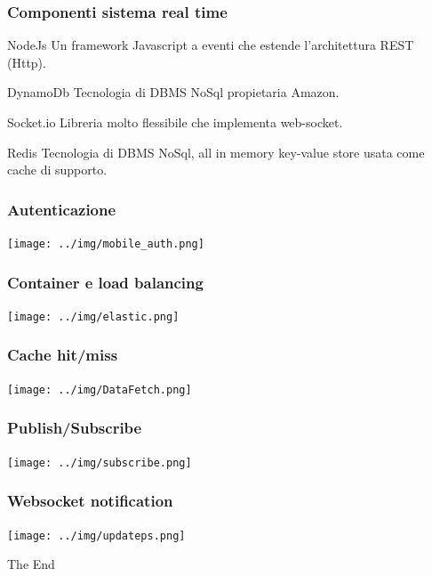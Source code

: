 \documentclass{beamer}
\begin{document}

\begin{frame}
\frametitle{Componenti sistema real time}
\begin{block}{NodeJs}
Un framework Javascript a eventi che estende l'architettura REST (Http). 
\end{block}

\begin{block}{DynamoDb}
Tecnologia di DBMS NoSql propietaria Amazon.
\end{block}

\begin{block}{Socket.io}
Libreria molto flessibile che implementa web-socket.
\end{block}

\begin{block}{Redis}
Tecnologia di DBMS NoSql, all in memory key-value store usata come cache di supporto.
\end{block}
\end{frame}





\begin{frame}
\frametitle{Autenticazione}
\centerline{\texttt{[image: ../img/mobile\_auth.png]}}
\end{frame}


\begin{frame}
\frametitle{Container e load balancing}
\centerline{\texttt{[image: ../img/elastic.png]}}
\end{frame}


\begin{frame}
\frametitle{Cache hit/miss}
\centerline{\texttt{[image: ../img/DataFetch.png]}}
\end{frame}



\begin{frame}
\frametitle{Publish/Subscribe}
\centerline{\texttt{[image: ../img/subscribe.png]}}
\end{frame}

\begin{frame}
\frametitle{Websocket notification}
\centerline{\texttt{[image: ../img/updateps.png]}}
\end{frame}





\begin{frame}
\Huge{\centerline{The End}}
\end{frame}

\end{document}
